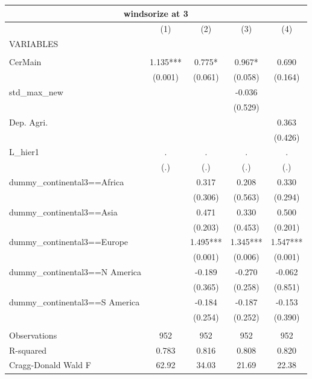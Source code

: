 \documentclass[12pt,a4paper]{article}
\begin{document}
\begin{tabular}{lcccc}
\multicolumn{5}{c}{windsorize at 3} \\ \hline
 & (1) & (2) & (3) & (4) \\
VARIABLES &  &  &  &  \\ \hline
 &  &  &  &  \\
CerMain & 1.135*** & 0.775* & 0.967* & 0.690 \\
 & (0.001) & (0.061) & (0.058) & (0.164) \\
std\_max\_new &  &  & -0.036 &  \\
 &  &  & (0.529) &  \\
Dep. Agri. &  &  &  & 0.363 \\
 &  &  &  & (0.426) \\
L\_hier1 & . & . & . & . \\
 & (.) & (.) & (.) & (.) \\
dummy\_continental3==Africa &  & 0.317 & 0.208 & 0.330 \\
 &  & (0.306) & (0.563) & (0.294) \\
dummy\_continental3==Asia &  & 0.471 & 0.330 & 0.500 \\
 &  & (0.203) & (0.453) & (0.201) \\
dummy\_continental3==Europe &  & 1.495*** & 1.345*** & 1.547*** \\
 &  & (0.001) & (0.006) & (0.001) \\
dummy\_continental3==N America &  & -0.189 & -0.270 & -0.062 \\
 &  & (0.365) & (0.258) & (0.851) \\
dummy\_continental3==S America &  & -0.184 & -0.187 & -0.153 \\
 &  & (0.254) & (0.252) & (0.390) \\
 &  &  &  &  \\
Observations & 952 & 952 & 952 & 952 \\
R-squared & 0.783 & 0.816 & 0.808 & 0.820 \\
 Cragg-Donald Wald F & 62.92 & 34.03 & 21.69 & 22.38 \\ \hline
\end{tabular}
\end{document}
